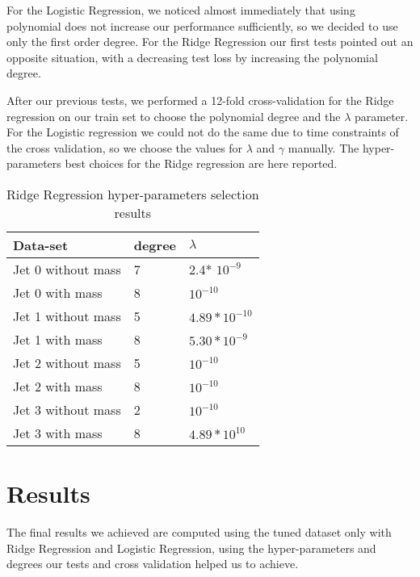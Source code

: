 \documentclass[10pt,article]{IEEEtran}
\begin{document}
For the Logistic Regression, we noticed almost immediately that using polynomial does not increase our performance sufficiently, so we decided to use only the first order degree. For the Ridge Regression our first tests pointed out an opposite situation, with a decreasing test loss by increasing the polynomial degree. 

After our previous tests, we performed a 12-fold cross-validation for the Ridge regression on our train set to choose the polynomial degree and the $\lambda$ parameter. For the Logistic regression we could not do the same due to time constraints of the cross validation, so we choose the values for $\lambda$ and $\gamma$ manually. The hyper-parameters best choices for the Ridge regression are here reported.

\begin{table}[hbt]
\centering
\label{tab:hypersresults}
\begin{tabular}{|l|l|l|} 
\hline
Data-set           & degree & $\lambda$         \\ 
\hline
Jet 0 without mass & 7      & 2.4* $10^{-9}$    \\ 
\cline{1-1}
Jet 0 with mass    & 8      & $10^{-10}$        \\ 
\cline{1-1}
Jet 1 without mass & 5      & $4.89*10^{-10}$   \\ 
\cline{1-1}
Jet 1 with mass    & 8      & $5.30*10^{-9}$    \\ 
\cline{1-1}
Jet 2 without mass & 5      & $10^{-10}$        \\ 
\cline{1-1}
Jet 2 with mass    & 8      & $10^{-10}$        \\ 
\cline{1-1}
Jet 3 without mass & 2      & $10^{-10}$        \\ 
\cline{1-1}
Jet 3 with mass    & 8      & $4.89 *10^{10}$   \\
\hline
\end{tabular}
\caption{Ridge Regression hyper-parameters selection results }
\vspace{-0.5cm}
\end{table}
\FloatBarrier


\section{Results}
\label{sec:results}
The final results we achieved are computed using the tuned dataset only with Ridge Regression and Logistic Regression, using the hyper-parameters and degrees our tests and cross validation helped us to achieve. 
\end{document}
